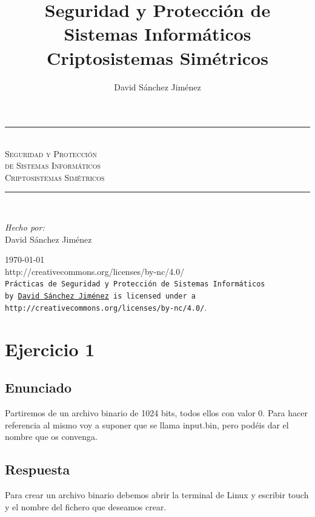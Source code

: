 \documentclass[10pt,a4paper,spanish]{report}
\title{Seguridad y Protección de Sistemas Informáticos \\
Criptosistemas Simétricos}
\author{David Sánchez Jiménez}
\newcommand{\HRule}{\rule{\linewidth}{0.5mm}} %
\begin{document}
\begin{titlepage}
 \begin{center}
  \HRule \\[0.8cm]
  \textsc{\huge Seguridad y Protección \\ de Sistemas Informáticos \\[0.5cm] Criptosistemas Simétricos}\\[1.6cm]
  \HRule \\[1cm]
  \begin{flushleft}
   \emph{Hecho por:}\\
   David Sánchez Jiménez
  \end{flushleft}
  \vspace{12cm}
  \large{\today}\\
  \vspace{0.5cm}
  {http://creativecommons.org/licenses/by-nc/4.0/}\\[0.5cm]
  \texttt{Prácticas de Seguridad y Protección de Sistemas Informáticos\\ by
   \href{mailto:dasaji92@gmail.com}{David Sánchez Jiménez} is licensed under a 
   {http://creativecommons.org/licenses/by-nc/4.0/}}.\\[3mm]
 \end{center}
\end{titlepage}

\tableofcontents
\newpage


\chapter{Ejercicio 1}

\section{Enunciado}
\noindent
Partiremos de un archivo binario de 1024 bits, todos ellos con valor 0. Para hacer referencia al mismo voy a suponer que se llama input.bin, pero podéis dar el nombre que os convenga.

\section{Respuesta}
\noindent
Para crear un archivo binario debemos abrir la terminal de Linux y escribir touch y el nombre del fichero que deseamos crear. \\
\end{document}
